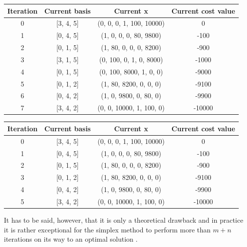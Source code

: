 \documentclass[a4paper,10 pt,titlepage,twoside]{book}
\theoremstyle{plain}
\theoremstyle{definition}
\theoremstyle{remark}
\begin{document}
\begin{table}[h]
	\begin{center}
	\begin{tabular}{|c|c|c|c|}
		\hline
		\textbf{Iteration} & \textbf{Current basis} & \textbf{Current x} & \textbf{Current cost value} \\ \hline
		0 & [3, 4, 5] & (0, 0, 0, 1, 100, 10000) & 0 \\ 
		1 & [0, 4, 5] & (1, 0, 0, 0, 80, 9800) & -100 \\
		2 & [0, 1, 5] & (1, 80, 0, 0, 0, 8200) & -900 \\
		3 & [3, 1, 5] & (0, 100, 0, 1, 0, 8000) & -1000 \\ 
		4 & [0, 1, 5] & (0, 100, 8000, 1, 0, 0) & -9000 \\ 
		5 & [0, 1, 2] & (1, 80, 8200, 0, 0, 0) & -9100 \\
		6 & [0, 4, 2] & (1, 0, 9800, 0, 80, 0) & -9900 \\ 
		7 & [3, 4, 2] & (0, 0, 10000, 1, 100, 0) & -10000 \\ \hline
	\end{tabular}
\end{center}
\end{table}

\begin{table}[h]
	\begin{center}
		\begin{tabular}{|c|c|c|c|}
			\hline
			\textbf{Iteration} & \textbf{Current basis} & \textbf{Current x} & \textbf{Current cost value} \\ \hline
			0 & [3, 4, 5] & (0, 0, 0, 1, 100, 10000) & 0 \\
			1 & [0, 4, 5] & (1, 0, 0, 0, 80, 9800) & -100 \\
			2 & [0, 1, 5] & (1, 80, 0, 0, 0, 8200) & -900 \\
			3 & [0, 1, 2] & (1, 80, 8200, 0, 0, 0) & -9100 \\
			4 & [0, 4, 2] & (1, 0, 9800, 0, 80, 0) & -9900 \\
			5 & [3, 4, 2] & (0, 0, 10000, 1, 100, 0) & -10000 \\ \hline
		\end{tabular}
	\end{center}
\end{table}

It has to be said, however, that it is only a theoretical drawback and in practice it is rather exceptional for the simplex method to perform more than $m + n$ iterations on its way to an optimal solution \cite{ComTeq}.
\\
\end{document}

